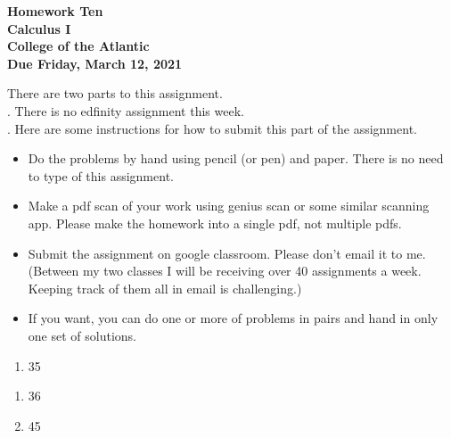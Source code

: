 \documentclass[12pt]{article}
\begin{document}
\pagestyle{empty}
 
\begin{center}
{\LARGE {\bf Homework Ten}}\\
\bigskip
{\Large {\bf Calculus I}}\\
\bigskip
{\Large {\bf College of the Atlantic}}\\
\bigskip
{ {\bf Due Friday, March 12, 2021}}\\ 
\end{center}
\medskip


\noindent There are two parts to this assignment.\\

. There is no edfinity assignment this
week.\\   


.  Here are some
instructions for how to submit this part of the assignment.
\begin{itemize}
\item Do the problems by hand using pencil (or pen) and paper.
  There is no need to type of this assignment.
\item Make a pdf scan of your work using genius scan or some
  similar scanning app.  Please make the homework into a single
  pdf, not multiple pdfs.
\item Submit the assignment on google classroom.  Please don't
  email it to me.  (Between my two classes I will be receiving
  over 40 assignments a week.  Keeping track of them all in email
  is challenging.)
\item If you want, you can do one or more of problems in pairs and hand 
  in only one set of solutions.\\
\end{itemize}




\begin{enumerate}
\setlength{\itemsep}{-1mm}
\item 35
\end{enumerate}

\begin{enumerate}
\setlength{\itemsep}{-1mm}
\item 36
\item 45
\end{enumerate}
\end{document}
